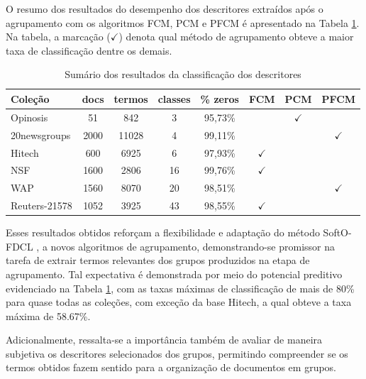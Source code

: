 O resumo dos resultados do desempenho dos descritores extraídos após o agrupamento com os
algoritmos FCM, PCM e PFCM é apresentado na Tabela \ref{table:pfcmsummary}. Na tabela, a marcação
($\checkmark$) denota qual método de agrupamento obteve a maior taxa de classificação dentre os
demais.

\begin{table}[!htp]
  \centering
  \begin{tabular}{ |l|c c c c c c c|}
    \hline
    {\bf Coleção} & {\bf docs} & {\bf termos} & {\bf classes} & {\bf \% zeros} & {\bf FCM} & {\bf
  PCM} & {\bf PFCM} \\
    \hline
    Opinosis & 51 & 842 & 3 & 95,73\% & & $\checkmark$ &  \\
    \hline
    20newsgroups & 2000 & 11028 & 4 & 99,11\% & & & $\checkmark$\\
    \hline
    Hitech & 600 & 6925 & 6 & 97,93\% & $\checkmark$ & & \\
    \hline
    NSF & 1600 & 2806 & 16 & 99,76\% & $\checkmark$ & & \\
    \hline
    WAP & 1560 & 8070 & 20 & 98,51\% & & & $\checkmark$ \\
    \hline
    Reuters-21578 & 1052 & 3925 & 43 & 98,55\% & $\checkmark$ & & \\
    \hline
  \end{tabular}
  \caption{Sumário dos resultados da classificação dos descritores}
  \label{table:pfcmsummary}
\end{table}

Esses resultados obtidos reforçam a flexibilidade e adaptação do método SoftO-FDCL
\cite{Nogueira2013}, a novos algoritmos de agrupamento, demonstrando-se promissor na tarefa de
extrair termos relevantes dos grupos produzidos na etapa de agrupamento. Tal expectativa é
demonstrada por meio do potencial preditivo evidenciado na Tabela \ref{table:pfcmsummary}, com as
taxas máximas de classificação de mais de 80\% para quase todas as coleções, com exceção da base
Hitech, a qual obteve a taxa máxima de 58.67\%.  

Adicionalmente, ressalta-se a importância também de avaliar de maneira subjetiva os descritores
selecionados dos grupos, permitindo  compreender se os termos obtidos fazem sentido para a
organização de documentos em grupos. 

